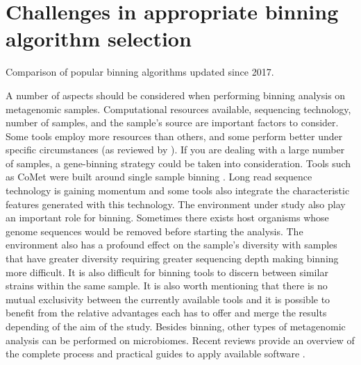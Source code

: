 \documentclass{article}
\begin{document}
\section{Challenges in appropriate binning algorithm selection}
\begin{table}
\begin{tiny}
\centering
\caption[Comparison of popular binning algorithms updated since 2017]{Comparison of popular binning algorithms updated since 2017.}
	
\label{Tbinningsoftware}
\end{tiny}
\end{table}
A number of aspects should be considered when performing binning analysis on metagenomic samples.
Computational resources available, sequencing technology, number of samples, and the sample's source are important factors to consider.
Some tools employ more resources than others, and some perform better under specific circumstances (as reviewed by ).
If you are dealing with a large number of samples, a gene-binning strategy could be taken into consideration.
Tools such as CoMet were built around single sample binning \cite{herath2017comet}.
Long read sequence technology is gaining momentum and some tools also integrate the characteristic features generated with this technology.
The environment under study also play an important role for binning.
Sometimes there exists host organisms whose genome sequences would be removed before starting the analysis.
The environment also has a profound effect on the sample's diversity with samples that have greater diversity requiring greater sequencing depth making binning more difficult.
It is also difficult for binning tools to discern between similar strains within the same sample.  
It is also worth mentioning that there is no mutual exclusivity between the currently available tools and it is possible to benefit from the relative advantages each has to offer and merge the results depending of the aim of the study.
Besides binning, other types of metagenomic analysis can be performed on microbiomes.
Recent reviews provide an overview of the complete process and practical guides to apply available software \cite{breitwieser2019review}.  
\end{document}
